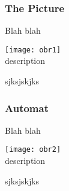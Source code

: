 \documentclass{beamer}
\begin{document}
\begin{frame}
\frametitle{The Picture}
Blah blah
\begin{center}
\texttt{[image: obr1]}\\
description
\end{center}
sjksjskjks
\end{frame}
\begin{frame}
\frametitle{Automat}
Blah blah
\begin{center}
\texttt{[image: obr2]}\\
description
\end{center}
sjksjskjks
\end{frame}
\end{document}

